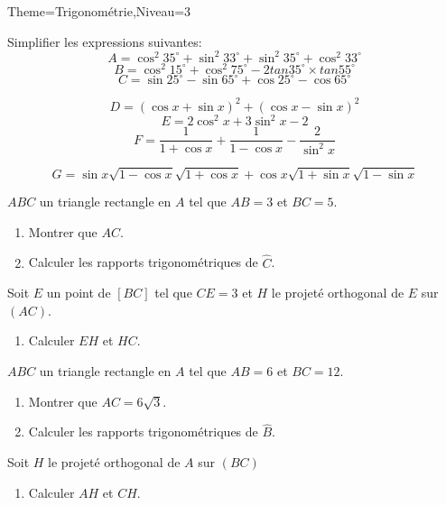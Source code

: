 \documentclass[a4paper,12pt]{article}
\begin{document}
\begin{Maquette}[Fiche]{Theme=Trigonométrie,Niveau=3}
\begin{exercice}
\begin{minipage}{.5\linewidth}
Simplifier les expressions suivantes:
$$A=\cos^{2}35^{\circ}+\sin^{2}33^{\circ}+\sin^{2}35^{\circ}+\cos^{2}33^{\circ}$$
$$B=\cos^{2}15^{\circ}+\cos^{2}75^{\circ}-2tan35^{\circ}\times tan55^{\circ} $$
$$C=\sin25^{\circ}-\sin65^{\circ}+\cos25^{\circ}-\cos65^{\circ} $$
\end{minipage}%
\begin{minipage}{.5\linewidth}
$$D=(\cos x + \sin x)^{2}+(\cos x - \sin x)^{2} $$
$$E=2\cos^{2}x+3\sin^{2}x-2 $$
$$F=\dfrac{1}{1+\cos x}+\dfrac{1}{1-\cos x}-\dfrac{2}{\sin^{2}x} $$
\end{minipage}
$$G=\sin x\sqrt{1-\cos x}\sqrt{1+\cos x}+\cos x\sqrt{1+\sin x }\sqrt{1-\sin x} $$
\end{exercice}


\begin{exercice}
$ABC$ un triangle rectangle en $A$ tel que $AB=3$ et $BC=5$.
\begin{enumerate}
\item Montrer que $AC$.
\item Calculer les rapports trigonométriques de $\widehat{C}$.
\end{enumerate}
Soit $E$ un point de $[BC]$ tel que $CE=3$ et $H$ le projeté orthogonal de $E$ sur $(AC)$.
\begin{enumerate}[start=3]
\item Calculer $EH$ et $HC$.
\end{enumerate}
\end{exercice}

\begin{exercice}
$ABC$ un triangle rectangle en $A$ tel que $AB=6$ et $BC=12$.
\begin{enumerate}
\item Montrer que $AC=6\sqrt{3}$.
\item Calculer les rapports trigonométriques de $\widehat{B}$.
\end{enumerate}
Soit $H$ le projeté orthogonal de $A$ sur $(BC)$
\begin{enumerate}[start=3]
\item Calculer $AH$ et $CH$.
\end{enumerate}
\end{exercice}




\end{Maquette}
\end{document}
